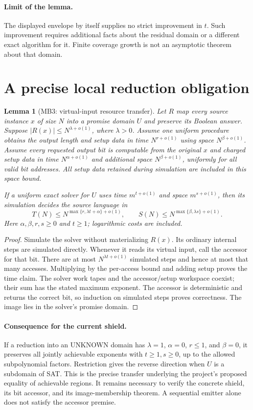 \documentclass[11pt]{article}
\newtheorem{lemma}{Lemma}
\begin{document}
\paragraph{Limit of the lemma.}
The displayed envelope by itself supplies no strict improvement in $t$.
Such improvement requires additional facts about the residual domain or a
different exact algorithm for it. Finite coverage growth is not an
asymptotic theorem about that domain.

\section{A precise local reduction obligation}

\begin{lemma}[MB3: virtual-input resource transfer]
Let $R$ map every source instance $x$ of size $N$ into a promise domain $U$
and preserve its Boolean answer. Suppose $|R(x)|\le N^{\lambda+o(1)}$,
where $\lambda>0$. Assume one uniform procedure obtains the output length
and setup data in time $N^{r+o(1)}$ using space $N^{\beta+o(1)}$.
Assume every requested output bit is computable from the original $x$
and charged setup data in time $N^{\alpha+o(1)}$ and additional
space $N^{\beta+o(1)}$, uniformly for all valid bit addresses.
All setup data retained during simulation are included in this space bound.

If a uniform exact solver for $U$ uses time $m^{t+o(1)}$ and
space $m^{s+o(1)}$, then its simulation decides the source language in
\[
T(N)\le
N^{\max\{r,\lambda t+\alpha\}+o(1)},\qquad
S(N)\le
N^{\max\{\beta,\lambda s\}+o(1)}.
\]
Here $\alpha,\beta,r,s\ge0$ and $t\ge1$; logarithmic costs are included.
\end{lemma}

\begin{proof}
Simulate the solver without materializing $R(x)$. Its ordinary internal
steps are simulated directly. Whenever it reads its virtual input,
call the accessor for that bit. There are at most
$N^{\lambda t+o(1)}$ simulated steps and hence at most that many accesses.
Multiplying by the per-access bound and adding setup proves the time
claim. The solver work tapes and the accessor/setup workspace coexist;
their sum has the stated maximum exponent. The accessor is deterministic
and returns the correct bit, so induction on simulated steps proves
correctness. The image lies in the solver's promise domain.
\end{proof}

\paragraph{Consequence for the current shield.}
If a reduction into an UNKNOWN domain has $\lambda=1$, $\alpha=0$,
$r\le1$, and $\beta=0$, it preserves all jointly achievable exponents
with $t\ge1,s\ge0$, up to the allowed subpolynomial factors.
Restriction gives the reverse direction when $U$ is a subdomain of SAT.
This is the precise transfer underlying the project's proposed equality
of achievable regions. It remains necessary to verify the concrete
shield, its bit accessor, and its image-membership theorem.
A sequential emitter alone does not satisfy the accessor premise.
\end{document}
